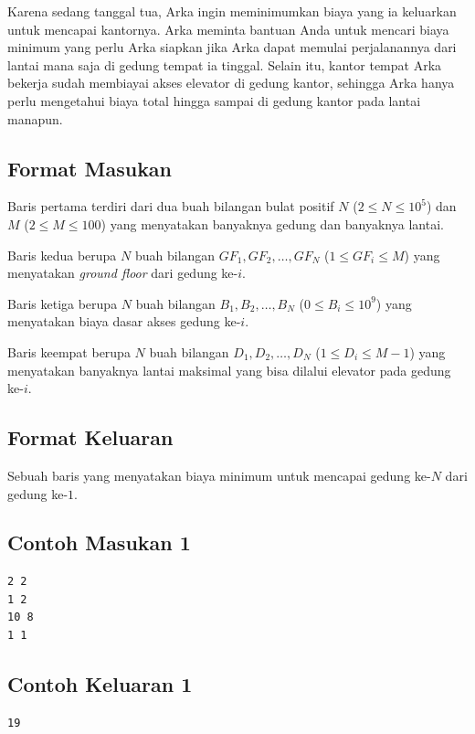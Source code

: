 \documentclass{article}
\begin{document}
Karena sedang tanggal tua, Arka ingin meminimumkan biaya yang ia keluarkan untuk mencapai kantornya. Arka meminta bantuan Anda untuk mencari biaya minimum yang perlu Arka siapkan jika Arka dapat memulai perjalanannya dari lantai mana saja di gedung tempat ia tinggal. Selain itu, kantor tempat Arka bekerja sudah membiayai akses elevator di gedung kantor, sehingga Arka hanya perlu mengetahui biaya total hingga sampai di gedung kantor pada lantai manapun.

\subsection*{Format Masukan}
Baris pertama terdiri dari dua buah bilangan bulat positif $N$ ($2 \leq N \leq 10^5$) dan $M$ ($2 \leq M \leq 100$) yang menyatakan banyaknya gedung dan banyaknya lantai.

Baris kedua berupa $N$ buah bilangan $GF_1, GF_2, \dots, GF_N$ ($1 \leq GF_{i} \leq M$) yang menyatakan \textit{ground floor} dari gedung ke-$i$.

Baris ketiga berupa $N$ buah bilangan $B_1, B_2, \dots, B_N$ ($0 \leq B_{i} \leq 10^9$) yang menyatakan biaya dasar akses gedung ke-$i$.

Baris keempat berupa $N$ buah bilangan $D_1, D_2, \dots, D_N$ ($1 \leq D_{i} \leq M-1$) yang menyatakan banyaknya lantai maksimal yang bisa dilalui elevator pada gedung ke-$i$.

\subsection*{Format Keluaran}
Sebuah baris yang menyatakan biaya minimum untuk mencapai gedung ke-$N$ dari gedung ke-$1$.

\begin{multicols}{2}
\subsection*{Contoh Masukan 1}
\begin{lstlisting}
2 2
1 2
10 8
1 1
\end{lstlisting}
\columnbreak
\subsection*{Contoh Keluaran 1}
\begin{lstlisting}
19
\end{lstlisting}
\vfill
\null
\end{multicols}
\end{document}
